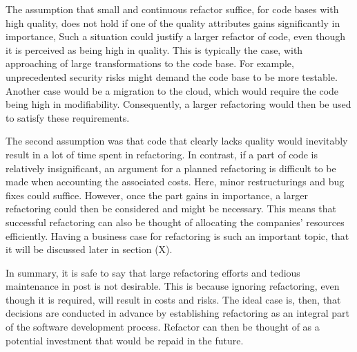 The assumption that small and continuous refactor suffice, for code bases with high quality, 
	does not hold if one of the quality attributes gains significantly in importance, 
Such a situation could justify a larger refactor of code, 
	even though it is perceived as being high in quality. 
This is typically the case,
	with approaching of large transformations to the code base. 
For example, unprecedented security risks might demand the code base 
	to be more testable.
Another case would be a migration to the cloud, which would require the code being high in modifiability. 
Consequently, a larger refactoring would then be used to satisfy these requirements.

The second assumption was that code that clearly lacks quality 
	would inevitably result in a lot of time spent in refactoring.
In contrast, 
	if a part of code is relatively insignificant,  
	an argument for a planned refactoring is difficult 
	to be made when accounting the associated costs. 
Here, minor restructurings and bug fixes could suffice. 
However, once the part gains in importance, 
	a larger refactoring could then be considered and might be necessary. 
This means that successful refactoring can also be thought of 
	allocating the companies' resources efficiently. 
Having a business case for refactoring is such an important topic, 
	that it will be discussed later in section (X).

In summary, it is safe to say 
	that large refactoring efforts and tedious maintenance in post is not desirable. 
This is because ignoring refactoring, even though it is required,
	will result in costs and risks.
The ideal case is, then, 
	that decisions are conducted in advance 
	by establishing refactoring as an integral part 
	of the software development process.
Refactor can then be thought of as a 
	potential investment that would be repaid in the future. 




